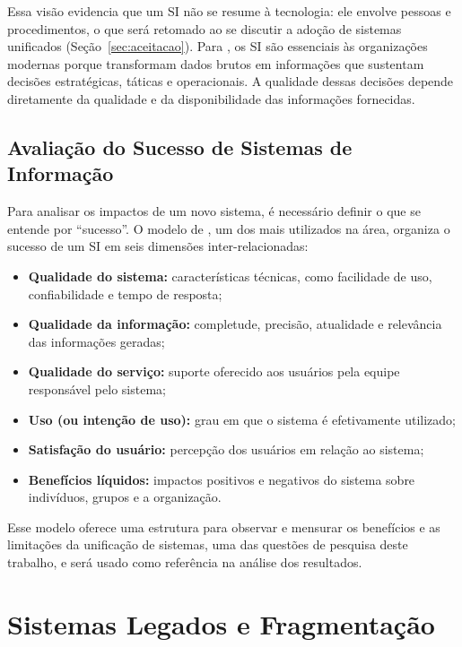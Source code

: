 Essa visão evidencia que um SI não se resume à tecnologia: ele envolve pessoas e procedimentos, o que será retomado ao se discutir a adoção de sistemas unificados (Seção~\ref{sec:aceitacao}). Para \citet{turban2010}, os SI são essenciais às organizações modernas porque transformam dados brutos em informações que sustentam decisões estratégicas, táticas e operacionais. A qualidade dessas decisões depende diretamente da qualidade e da disponibilidade das informações fornecidas.

\subsection{Avaliação do Sucesso de Sistemas de Informação}

Para analisar os impactos de um novo sistema, é necessário definir o que se entende por ``sucesso''. O modelo de \citet{delone2003}, um dos mais utilizados na área, organiza o sucesso de um SI em seis dimensões inter-relacionadas:

\begin{itemize}
    \item \textbf{Qualidade do sistema:} características técnicas, como facilidade de uso, confiabilidade e tempo de resposta;
    \item \textbf{Qualidade da informação:} completude, precisão, atualidade e relevância das informações geradas;
    \item \textbf{Qualidade do serviço:} suporte oferecido aos usuários pela equipe responsável pelo sistema;
    \item \textbf{Uso (ou intenção de uso):} grau em que o sistema é efetivamente utilizado;
    \item \textbf{Satisfação do usuário:} percepção dos usuários em relação ao sistema;
    \item \textbf{Benefícios líquidos:} impactos positivos e negativos do sistema sobre indivíduos, grupos e a organização.
\end{itemize}

Esse modelo oferece uma estrutura para observar e mensurar os benefícios e as limitações da unificação de sistemas, uma das questões de pesquisa deste trabalho, e será usado como referência na análise dos resultados.

\section{Sistemas Legados e Fragmentação}
\label{sec:legados}


